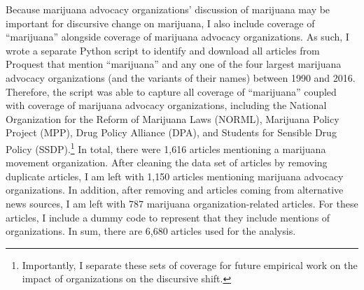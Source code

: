 Because marijuana advocacy organizations' discussion of marijuana may be important for discursive change on marijuana, I also include coverage of ``marijuana'' alongside coverage of marijuana advocacy organizations. As such, I wrote a separate Python script to identify and download all articles from Proquest that mention ``marijuana'' and any one of the four largest marijuana advocacy organizations (and the variants of their names) between 1990 and 2016. Therefore, the script was able to capture all coverage of ``marijuana'' coupled with coverage of marijuana advocacy organizations, including the National Organization for the Reform of Marijuana Laws (NORML), Marijuana Policy Project (MPP), Drug Policy Alliance (DPA), and Students for Sensible Drug Policy (SSDP).\footnote{Importantly, I separate these sets of coverage for future empirical work on the impact of organizations on the discursive shift.} In total, there were 1,616 articles mentioning a marijuana movement organization. After cleaning the data set of articles by removing duplicate articles, I am left with 1,150 articles mentioning marijuana advocacy organizations. In addition, after removing and articles coming from alternative news sources, I am left with 787 marijuana organization-related articles. For these articles, I include a dummy code to represent that they include mentions of organizations. In sum, there are 6,680 articles used for the analysis. 





